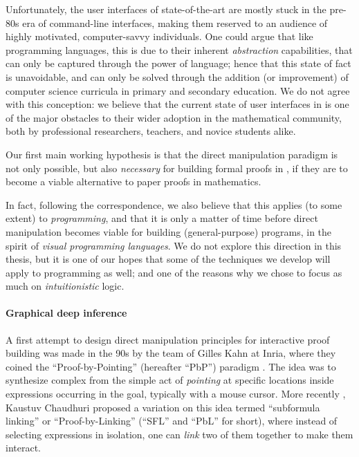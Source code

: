 Unfortunately, the user interfaces of state-of-the-art  are
mostly stuck in the pre-80s era of command-line interfaces, making them reserved
to an audience of highly motivated, computer-savvy individuals. One could argue
that like programming languages, this is due to their inherent
\emph{abstraction} capabilities, that can only be captured through the 
power of language; hence that this state of fact is unavoidable, and can only be
solved through the addition (or improvement) of computer science curricula in
primary and secondary education. We do not agree with this conception: we
believe that the current state of user interfaces in  is one of the major
obstacles to their wider adoption in the mathematical community, both by
professional researchers, teachers, and novice students alike.

\begin{emphpar}
  Our first main working hypothesis is that the direct manipulation paradigm is
  not only possible, but also \emph{necessary} for building formal proofs in
  , if they are to become a viable alternative to paper proofs in
  mathematics.
\end{emphpar}

In fact, following the  correspondence, we also believe that
this applies (to some extent) to \emph{programming}, and that it is only a
matter of time before direct manipulation becomes viable for building
(general-purpose) programs, in the spirit of \emph{visual programming
languages}. We do not explore this direction in this thesis, but it is one of
our hopes that some of the techniques we develop will apply to programming as
well; and one of the reasons why we chose to focus as much on
\emph{intuitionistic} logic.

\paragraph{Graphical deep inference}

A first attempt to design direct manipulation principles for interactive proof
building was made in the 90s by the team of Gilles Kahn at Inria, where they
coined the ``Proof-by-Pointing'' (hereafter ``PbP'') paradigm .
The idea was to synthesize complex  from the simple act of
\emph{pointing} at specific locations inside expressions occurring in the goal,
typically with a mouse cursor. More recently , Kaustuv
Chaudhuri proposed a variation on this idea termed ``subformula linking'' or
``Proof-by-Linking'' (``SFL'' and ``PbL'' for short), where instead of selecting
expressions in isolation, one can \emph{link} two of them together to make them
interact.

